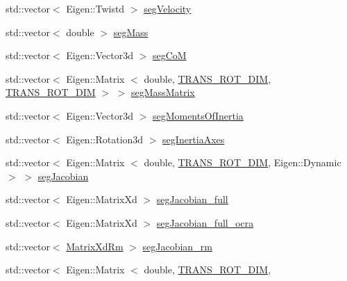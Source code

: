 \begin{DoxyCompactItemize}
\item 
std\-::vector$<$ \-Eigen\-::\-Twistd $>$ \hyperlink{structOcraWbiModel_1_1OcraWbiModel__pimpl_a6e95ae9d994aa67c9a2fc4021f80bb54}{seg\-Velocity}
\item 
std\-::vector$<$ double $>$ \hyperlink{structOcraWbiModel_1_1OcraWbiModel__pimpl_a6cdb912e87fd9cea517e098615c8f945}{seg\-Mass}
\item 
std\-::vector$<$ \-Eigen\-::\-Vector3d $>$ \hyperlink{structOcraWbiModel_1_1OcraWbiModel__pimpl_af244a33c7309714ca793d29247ead8b8}{seg\-Co\-M}
\item 
std\-::vector$<$ \-Eigen\-::\-Matrix\*
$<$ double, \hyperlink{OcraWbiModel_8cpp_ab4a87cb824ceff256c6b8bce7701af58}{\-T\-R\-A\-N\-S\-\_\-\-R\-O\-T\-\_\-\-D\-I\-M}, \*
\hyperlink{OcraWbiModel_8cpp_ab4a87cb824ceff256c6b8bce7701af58}{\-T\-R\-A\-N\-S\-\_\-\-R\-O\-T\-\_\-\-D\-I\-M} $>$ $>$ \hyperlink{structOcraWbiModel_1_1OcraWbiModel__pimpl_a3d0cb4cfda4c6ce54020d61f5845dedb}{seg\-Mass\-Matrix}
\item 
std\-::vector$<$ \-Eigen\-::\-Vector3d $>$ \hyperlink{structOcraWbiModel_1_1OcraWbiModel__pimpl_a478fcde74e00dc9b8235bbe5a2c2cb75}{seg\-Moments\-Of\-Inertia}
\item 
std\-::vector$<$ \-Eigen\-::\-Rotation3d $>$ \hyperlink{structOcraWbiModel_1_1OcraWbiModel__pimpl_aba2d3ed2e0c2a1a1b8b4d40c3df6a4a5}{seg\-Inertia\-Axes}
\item 
std\-::vector$<$ \-Eigen\-::\-Matrix\*
$<$ double, \hyperlink{OcraWbiModel_8cpp_ab4a87cb824ceff256c6b8bce7701af58}{\-T\-R\-A\-N\-S\-\_\-\-R\-O\-T\-\_\-\-D\-I\-M}, \*
\-Eigen\-::\-Dynamic $>$ $>$ \hyperlink{structOcraWbiModel_1_1OcraWbiModel__pimpl_a3430097cc1a200a4ff5abcafd52a7d44}{seg\-Jacobian}
\item 
std\-::vector$<$ \-Eigen\-::\-Matrix\-Xd $>$ \hyperlink{structOcraWbiModel_1_1OcraWbiModel__pimpl_abdfc807c93bad49781c9ad0f1588b203}{seg\-Jacobian\-\_\-full}
\item 
std\-::vector$<$ \-Eigen\-::\-Matrix\-Xd $>$ \hyperlink{structOcraWbiModel_1_1OcraWbiModel__pimpl_ad4acb4942706d77c1dfd480132592ded}{seg\-Jacobian\-\_\-full\-\_\-ocra}
\item 
std\-::vector$<$ \hyperlink{namespaceocra__icub_aa5e36a19ed031c28ca83c207bd7dd83f}{\-Matrix\-Xd\-Rm} $>$ \hyperlink{structOcraWbiModel_1_1OcraWbiModel__pimpl_a08c7db0bf6de072dc07a5810311aba48}{seg\-Jacobian\-\_\-rm}
\item 
std\-::vector$<$ \-Eigen\-::\-Matrix\*
$<$ double, \hyperlink{OcraWbiModel_8cpp_ab4a87cb824ceff256c6b8bce7701af58}{\-T\-R\-A\-N\-S\-\_\-\-R\-O\-T\-\_\-\-D\-I\-M}, \*

\end{DoxyCompactItemize}
